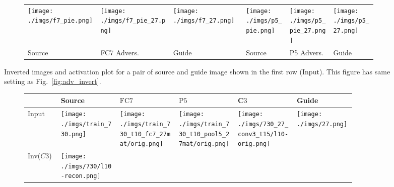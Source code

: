 \documentclass{article} %
\begin{document}
\begin{figure*}[h!]
\begin{subfigure}[t]{\linewidth}{
\centering
\renewcommand{\arraystretch}{1}
\setlength\tabcolsep{.1pt}
\begin{tabular}{
|>{\centering\arraybackslash}m{0.205\linewidth}
>{\centering\arraybackslash}m{0.205\linewidth}
>{\centering\arraybackslash}m{0.205\linewidth}|
>{\centering\arraybackslash}m{0.125\linewidth}
>{\centering\arraybackslash}m{0.125\linewidth}
>{\centering\arraybackslash}m{0.125\linewidth}|
}
\hline
\texttt{[image: ./imgs/f7\_pie.png]} &
\texttt{[image: ./imgs/f7\_pie\_27.png]} &
\texttt{[image: ./imgs/f7\_27.png]} &
\texttt{[image: ./imgs/p5\_pie.png]} &
\texttt{[image: ./imgs/p5\_pie\_27.png]} &
\texttt{[image: ./imgs/p5\_27.png]}\\
Source & FC7 Advers. & Guide & Source & P5 Advers. & Guide \\ \hline
\end{tabular}
}
\end{subfigure}
\caption{
    Inverted images and activation plot for a pair of source and guide image
    shown in the first row (Input). This figure has same setting as
    Fig.~\ref{fig:adv_invert}.
}
\label{fig:adv_invert4}
\end{figure*}\begin{figure}[h!]
    \centering
\begin{subfigure}[t]{\linewidth}{
\renewcommand{\arraystretch}{1}
\setlength\tabcolsep{2pt}
\begin{tabular}{|
>{\centering\arraybackslash}m{0.09\linewidth} |
>{\centering\arraybackslash}m{0.167\linewidth} |
>{\centering\arraybackslash}m{0.167\linewidth}
>{\centering\arraybackslash}m{0.167\linewidth}
>{\centering\arraybackslash}m{0.167\linewidth} |
>{\centering\arraybackslash}m{0.167\linewidth} | }
\hline
& Source & $\text{FC}7$ & $\text{P}5$ & C$3$ &Guide  \\\hline Input
& \texttt{[image: ./imgs/train\_730.png]}
& \texttt{[image: ./imgs/train\_730\_t10\_fc7\_27mat/orig.png]}
&
\texttt{[image: ./imgs/train\_730\_t10\_pool5\_27mat/orig.png]} &
\texttt{[image: ./imgs/730\_27\_conv3\_t15/l10-orig.png]} &
\texttt{[image: ./imgs/27.png]} \\
Inv($C3$)
& \texttt{[image: ./imgs/730/l10-recon.png]}

\end{tabular}}
\end{subfigure}
\end{figure}
\end{document}
